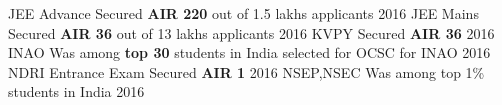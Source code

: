 
\begin{cvhonors}
  \cvhonor
    {JEE Advance}
    {Secured \textbf{AIR 220} out of 1.5 lakhs applicants}
    {}
    {2016}
  \cvhonor
    {JEE Mains}
    {Secured \textbf{AIR 36} out of 13 lakhs applicants}
    {}
    {2016}
  \cvhonor
    {KVPY}
    {Secured \textbf{AIR 36}}
    {}
    {2016}
  \cvhonor
    {INAO}
    {Was among \textbf{top 30} students in India selected for OCSC for INAO}
    {}
    {2016}
   \cvhonor
    {NDRI Entrance Exam}
    {Secured \textbf{AIR 1}}
    {}
    {2016}
   \cvhonor
    {NSEP,NSEC}
    {Was among top 1\% students in India}
    {}
    {2016}

\end{cvhonors}

